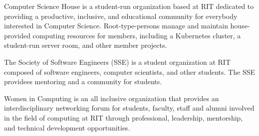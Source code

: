 \medskip


\medskip


\smallskip
\smallskip


\medskip
{}

Computer Science House is a student-run organization based at RIT dedicated to providing a productive, inclusive, and educational community for everybody interested in Computer Science.
Root-type-persons manage and maintain house-provided computing resources for members, including a Kubernetes cluster, a student-run server room, and other member projects.

\divider

The Society of Software Engineers (SSE) is a student organization at RIT composed of software engineers, computer scientists, and other students. The SSE providees mentoring and a community for students.

\divider

Women in Computing is an all inclusive organization that provides an interdisciplinary networking forum for students, faculty, staff and alumni involved in the field of computing at RIT through professional, leadership, mentorship, and technical development opportunities.



